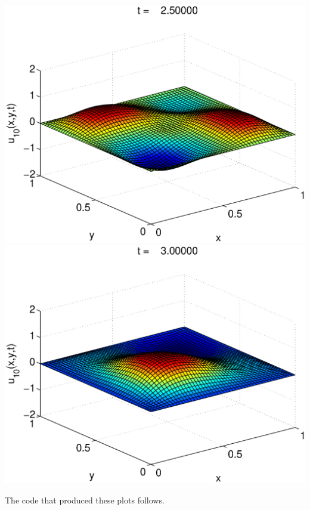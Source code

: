 \begin{solution}
\begin{enumerate}
\begin{center}
\includegraphics[scale=0.37]{wave2d_5} \quad
\includegraphics[scale=0.37]{wave2d_6} 
\end{center}

The code that produced these plots follows.



\end{enumerate}
\end{solution}